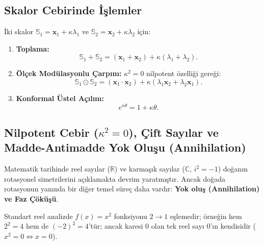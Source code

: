 \documentclass[11pt,a4paper]{article}
\begin{document}
\subsection{Skalor Cebirinde İşlemler}
İki skalor $\mathbb{S}_1 = \mathbf{x}_1 + \kappa \lambda_1$ ve $\mathbb{S}_2 = \mathbf{x}_2 + \kappa \lambda_2$ için:
\begin{enumerate}
    \item \textbf{Toplama:}
          \begin{equation}
              \mathbb{S}_1 + \mathbb{S}_2 = (\mathbf{x}_1 + \mathbf{x}_2) + \kappa (\lambda_1 + \lambda_2).
          \end{equation}
    \item \textbf{Ölçek Modülasyonlu Çarpım:}
          $\kappa^2 = 0$ nilpotent özelliği gereği:
          \begin{equation}
              \mathbb{S}_1 \odot \mathbb{S}_2 = (\mathbf{x}_1 \cdot \mathbf{x}_2) + \kappa (\lambda_1 \mathbf{x}_2 + \lambda_2 \mathbf{x}_1).
          \end{equation}
    \item \textbf{Konformal Üstel Açılım:}
          \begin{equation}
              e^{\kappa \theta} = 1 + \kappa \theta.
              \label{eq:kappa_ustel}
          \end{equation}
\end{enumerate}

\subsection{Nilpotent Cebir ($\kappa^2 = 0$), Çift Sayılar ve Madde-Antimadde Yok Oluşu (Annihilation)}
\label{sec:nilpotent_annihilation}

Matematik tarihinde reel sayılar ($\mathbb{R}$) ve karmaşık sayılar ($\mathbb{C}$, $i^2 = -1$) doğanın rotasyonel simetrilerini açıklamakta devrim yaratmıştır. Ancak doğada rotasyonun yanında bir diğer temel süreç daha vardır: \textbf{Yok oluş (Annihilation) ve Faz Çöküşü}.

Standart reel analizde $f(x) = x^2$ fonksiyonu $2 \to 1$ eşlemedir; örneğin hem $2^2 = 4$ hem de $(-2)^2 = 4$'tür; ancak karesi $0$ olan tek reel sayı $0$'ın kendisidir ($x^2 = 0 \iff x = 0$).
\end{document}
